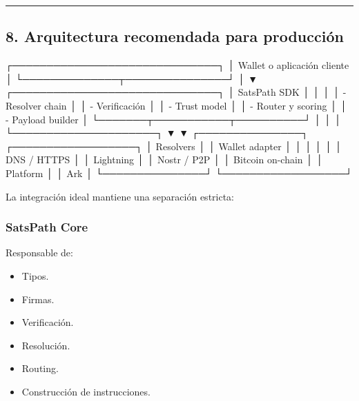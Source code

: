 \documentclass[
]{article}
\newenvironment{Shaded}{}{}
\newcommand{\NormalTok}[1]{#1}
\providecommand{\tightlist}{%
  \setlength{\itemsep}{0pt}\setlength{\parskip}{0pt}}
\begin{document}
\begin{center}\rule{0.5\linewidth}{0.5pt}\end{center}

\hypertarget{arquitectura-recomendada-para-producciuxf3n}{%
\subsection{8. Arquitectura recomendada para
producción}\label{arquitectura-recomendada-para-producciuxf3n}}

\begin{Shaded}
\begin{Highlighting}[]
\NormalTok{┌──────────────────────────────┐}
\NormalTok{│ Wallet o aplicación cliente │}
\NormalTok{└──────────────┬───────────────┘}
\NormalTok{               │}
\NormalTok{               ▼}
\NormalTok{┌──────────────────────────────┐}
\NormalTok{│ SatsPath SDK                 │}
\NormalTok{│                              │}
\NormalTok{│ {-} Resolver chain             │}
\NormalTok{│ {-} Verificación               │}
\NormalTok{│ {-} Trust model                │}
\NormalTok{│ {-} Router y scoring           │}
\NormalTok{│ {-} Payload builder            │}
\NormalTok{└───────┬───────────┬──────────┘}
\NormalTok{        │           │}
\NormalTok{        │           └─────────────────────┐}
\NormalTok{        ▼                                 ▼}
\NormalTok{┌───────────────┐               ┌──────────────────┐}
\NormalTok{│ Resolvers     │               │ Wallet adapter   │}
\NormalTok{│               │               │                  │}
\NormalTok{│ DNS / HTTPS   │               │ Lightning        │}
\NormalTok{│ Nostr / P2P   │               │ Bitcoin on{-}chain │}
\NormalTok{│ Platform      │               │ Ark              │}
\NormalTok{└───────────────┘               └──────────────────┘}
\end{Highlighting}
\end{Shaded}

La integración ideal mantiene una separación estricta:

\hypertarget{satspath-core}{%
\subsubsection{SatsPath Core}\label{satspath-core}}

Responsable de:

\begin{itemize}
\tightlist
\item
  Tipos.
\item
  Firmas.
\item
  Verificación.
\item
  Resolución.
\item
  Routing.
\item
  Construcción de instrucciones.
\end{itemize}
\end{document}
